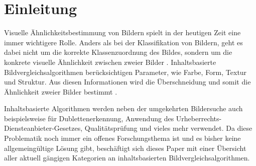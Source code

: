 \begin{abstract}
    Diese Dokumentation enth"alt eine sortierte Liste der wichtigsten
    \LaTeX--Befehle. Die einzelnen Listeneintr"age sind untereinander
    durch viele Querverweise verkettet, die ein Auffinden inhaltlich
    zusammengeh"origer Informationen erheblich erleichtern.
\end{abstract}

\section{Einleitung}\label{einleitung}
Visuelle Ähnlichkeitsbestimmung von Bildern spielt in der heutigen Zeit eine
immer wichtigere Rolle. Anders als bei der Klassifikation von Bildern, geht es
dabei nicht um die korrekte Klassenzuordnung des Bildes, sondern um die konkrete 
visuelle Ähnlichkeit zwischen zweier Bilder \parencite{intro-classification}. 
Inhaltsbasierte Bildvergleichsalgorithmen berücksichtigen Parameter, wie Farbe,
Form, Textur und Struktur. Aus diesen Informationen wird die Überschneidung und
somit die Ähnlichkeit zweier Bilder bestimmt \parencite{intro-cibr}.

Inhaltsbasierte Algorithmen werden neben der umgekehrten Bildersuche
auch beispielsweise für Dublettenerkennung, Anwendung des
Urheberrechts-Diensteanbieter-Gesetzes, Qualitätsprüfung und vieles mehr
verwendet. Da diese Problematik noch immer ein offenes Forschungsthema ist und
es bisher keine allgemeingültige Lösung gibt, beschäftigt sich dieses Paper mit
einer Übersicht aller aktuell gängigen Kategorien an inhaltsbasierten
Bildvergleichsalgorithmen.